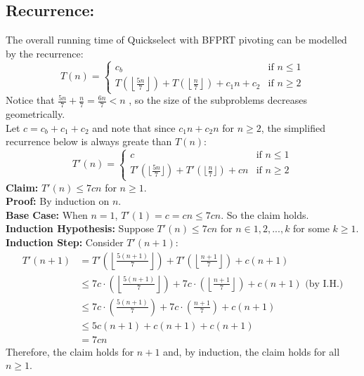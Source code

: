 \documentclass[12pt, b5paper]{article}
\newcommand{\floor}[1]{\left\lfloor #1 \right\rfloor}
\begin{document}
\subsection*{Recurrence:}
The overall running time of Quickselect with BFPRT pivoting can be modelled by the recurrence:
$$
T(n) = 
\begin{cases}
    c_b & \text{if } n \leq 1 \\
    T\left(\floor{\frac{5n}{7}}\right) + T\left(\floor{\frac{n}{7}}\right) + c_1n + c_2 & \text{if } n \geq 2
\end{cases}
$$
Notice that $\frac{5n}{7} + \frac{n}{7} = \frac{6n}{7} < n$ , so the size of the subproblems decreases 
geometrically. \\
Let $c=c_b + c_1 + c_2$ and note that since $c_{1}n + c_{2}n$ for $n\geq 2$, the simplified recurrence below is 
always greate than $T(n)$:
$$
T'(n) = 
\begin{cases}
    c & \text{if } n \leq 1 \\
    T'\left(\lfloor \frac{5n}{7} \rfloor\right) + T'\left(\lfloor\frac{n}{7}\rfloor\right) + cn & \text{if } n \geq 2
\end{cases}
$$
\newline
\textbf{Claim: } $T'(n) \leq 7cn$ for $n \geq 1$. \\
\newline
\textbf{Proof: } By induction on $n$. \\
\newline
\textbf{Base Case: }
When $n=1$, $T'(1) = c = cn \leq 7cn$. So the claim holds. \\
\newline
\textbf{Induction Hypothesis: }
Suppose $T'(n) \leq 7cn$ for $n \in {1, 2, ..., k}$ for some $k \geq 1$. \\
\newline
\textbf{Induction Step: }
Consider $T'(n + 1)$:
\begin{align*}  
T'(n+1) &= T'\left(\floor{\frac{5(n+1)}{7}}\right) + T'\left(\floor{\frac{n+1}{7}}\right) + c(n+1) \\
&\leq 7c \cdot \left(\floor{\frac{5(n+1)}{7}}\right) + 7c \cdot \left(\floor{\frac{n+1}{7}}\right) + c(n+1) \text{ (by I.H.)} \\
&\leq 7c \cdot \left(\frac{5(n+1)}{7}\right) + 7c \cdot \left(\frac{n+1}{7}\right) + c(n+1) \\
&\leq 5c(n+1) + c(n+1) + c(n+1) \\
&= 7cn
\end{align*}
Therefore, the claim holds for $n+1$ and, by induction, the claim holds for all $n\geq1$.
\end{document}
